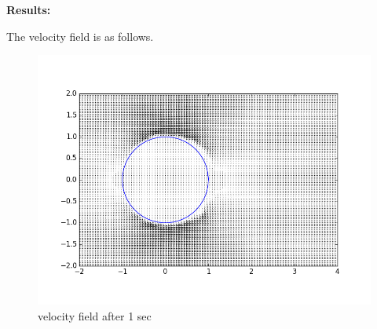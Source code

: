 \documentclass[a4paper,11pt]{article}
\begin{document}
\textbf{Results:}

\indent The velocity field is as follows.
\begin{figure}[ht]
    \centering
    \includegraphics[width=.8\linewidth]{qui_1.png}
    \caption{velocity field after 1 sec}
    \label{fig:ex1}    
\end{figure}
\end{document}
